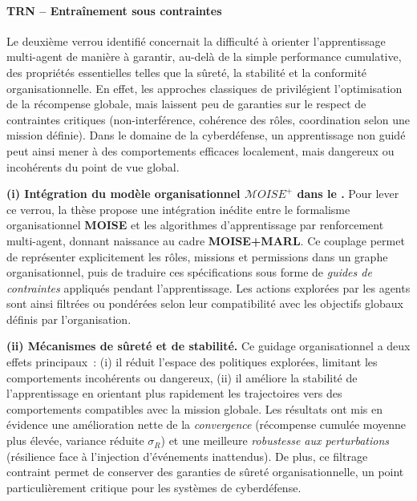 \paragraph{TRN – Entraînement sous contraintes}

Le deuxième verrou identifié concernait la difficulté à orienter l’apprentissage multi-agent de manière à garantir, au-delà de la simple performance cumulative, des propriétés essentielles telles que la sûreté, la stabilité et la conformité organisationnelle.
En effet, les approches classiques de  privilégient l’optimisation de la récompense globale, mais laissent peu de garanties sur le respect de contraintes critiques (non-interférence, cohérence des rôles, coordination selon une mission définie).
Dans le domaine de la cyberdéfense, un apprentissage non guidé peut ainsi mener à des comportements efficaces localement, mais dangereux ou incohérents du point de vue global.

\medskip
\noindent
\textbf{(i) Intégration du modèle organisationnel $\mathcal{M}OISE^+$ dans le .}
Pour lever ce verrou, la thèse propose une intégration inédite entre le formalisme organisationnel \textbf{MOISE} et les algorithmes d’apprentissage par renforcement multi-agent, donnant naissance au cadre \textbf{MOISE+MARL}.
Ce couplage permet de représenter explicitement les rôles, missions et permissions dans un graphe organisationnel, puis de traduire ces spécifications sous forme de \textit{guides de contraintes} appliqués pendant l’apprentissage.
Les actions explorées par les agents sont ainsi filtrées ou pondérées selon leur compatibilité avec les objectifs globaux définis par l’organisation.

\medskip
\noindent
\textbf{(ii) Mécanismes de sûreté et de stabilité.}
Ce guidage organisationnel a deux effets principaux~:
(i) il réduit l’espace des politiques explorées, limitant les comportements incohérents ou dangereux,
(ii) il améliore la stabilité de l’apprentissage en orientant plus rapidement les trajectoires vers des comportements compatibles avec la mission globale.
Les résultats ont mis en évidence une amélioration nette de la \textit{convergence} (récompense cumulée moyenne plus élevée, variance réduite $\sigma_R$) et une meilleure \textit{robustesse aux perturbations} (résilience face à l’injection d’événements inattendus).
De plus, ce filtrage contraint permet de conserver des garanties de sûreté organisationnelle, un point particulièrement critique pour les systèmes de cyberdéfense.

